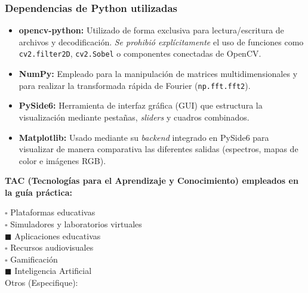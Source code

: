 \documentclass[11pt]{article}
\begin{document}
\subsubsection*{Dependencias de Python utilizadas}
\begin{itemize}
    \item \textbf{opencv-python:} Utilizado de forma exclusiva para lectura/escritura de archivos y decodificación. \textit{Se prohibió explícitamente} el uso de funciones como \texttt{cv2.filter2D}, \texttt{cv2.Sobel} o componentes conectadas de OpenCV.
    \item \textbf{NumPy:} Empleado para la manipulación de matrices multidimensionales y para realizar la transformada rápida de Fourier (\texttt{np.fft.fft2}).
    \item \textbf{PySide6:} Herramienta de interfaz gráfica (GUI) que estructura la visualización mediante pestañas, \textit{sliders} y cuadros combinados.
    \item \textbf{Matplotlib:} Usado mediante su \textit{backend} integrado en PySide6 para visualizar de manera comparativa las diferentes salidas (espectros, mapas de color e imágenes RGB).
\end{itemize}

\textbf{TAC (Tecnologías para el Aprendizaje y Conocimiento) empleados en la guía práctica:}

$\square$ Plataformas educativas \\
$\square$ Simuladores y laboratorios virtuales \\
$\blacksquare$ Aplicaciones educativas \\
$\square$ Recursos audiovisuales \\
$\square$ Gamificación \\
$\blacksquare$ Inteligencia Artificial \\
Otros (Especifique): \underline{\hspace{5cm}}
\end{document}
